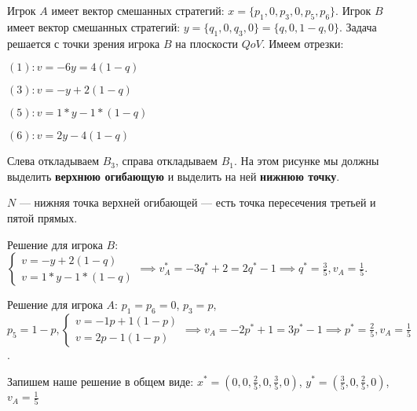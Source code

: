 \documentclass{article}
\begin{document}
Игрок $A$ имеет вектор смешанных стратегий: $x = \{ p_{1}, 0, p_{3}, 0, p_{5}, p_{6} \}$. Игрок $B$ имеет вектор смешанных стратегий: $y = \{ q_{1}, 0, q_{3}, 0 \} = \{ q, 0, 1 - q, 0 \}$. Задача решается с точки зрения игрока $B$ на плоскости $QoV$. Имеем отрезки:

$(1): v = -6y = 4(1 - q)$

$(3): v = -y + 2(1-q)$

$(5): v = 1*y - 1*(1-q)$

$(6): v = 2y - 4(1-q)$

Слева откладываем $B_{3}$, справа откладываем $B_{1}$. На этом рисунке мы должны выделить \textbf{верхнюю огибающую} и выделить на ней \textbf{нижнюю точку}.

$N$ — нижняя точка верхней огибающей — есть точка пересечения третьей и пятой прямых.

Решение для игрока $B$: $\begin{cases}
    v = -y + 2(1-q) \\
    v = 1*y - 1*(1-q)
\end{cases} \implies v_{A}^{*} = -3q^{*} + 2 = 2q^{*} - 1 \implies q^{*} = \frac{3}{5}, v_{A} = \frac{1}{5}$.

Решение для игрока $A$: $p_{1} = p_{6} = 0$, $p_{3} = p$, $p_{5} = 1 - p, \begin{cases}
    v = -1p + 1 (1 - p) \\
    v = 2p - 1 (1 - p)
\end{cases} \implies v_{A} = -2p^{*} + 1 = 3p^{*} -1 \implies p^{*} = \frac{2}{5}, v_{A} = \frac{1}{5}$.

Запишем наше решение в общем виде: $x^{*} = ( 0, 0, \frac{2}{5}, 0, \frac{3}{5}, 0 )$, $y^{*} = ( \frac{3}{5}, 0, \frac{2}{5}, 0 )$, $v_{A} = \frac{1}{5}$
\end{document}

